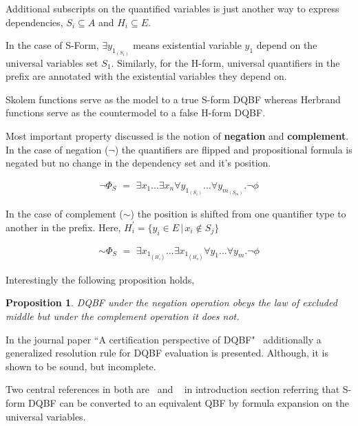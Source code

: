 \documentclass{article}
\newtheorem{prop}{Proposition}
\begin{document}
Additional subscripts on the quantified variables is just another way to express dependencies, $S_{i} \subseteq A$ and $H_{i} \subseteq E$.

In the case of S-Form, $\exists y_{1_{(S_{1})}}$ means  existential variable $y_{1}$ depend on the universal variables set $S_{1}$. 
%
Similarly, for the H-form, universal quantifiers in the prefix are annotated with the existential variables they depend on. 
     
Skolem functions serve as the model to a true S-form DQBF whereas Herbrand functions serve as the countermodel to a false H-form DQBF.

Most important property discussed is the notion of \textbf{negation} and \textbf{complement}.
%
In the case of negation ($\neg$) the quantifiers are flipped and propositional formula is negated but no change in the dependency set and it's position.
 
\begin{align}
\neg \Phi_{S} \,\, =   \,\, \exists x_{1}... \exists x_{n} \forall y_{1_{(S_{1})}}...\forall y_{m_{(S_{m})}} . \neg \phi \label{eq3}
\end{align}
 
In the case of complement ($\sim$) the position is shifted from one quantifier type to another in the prefix. Here, $H^{\prime}_{i} = \{ y_{i} \in E \, | \, x_{i} \notin S_{j} \}$
 
\begin{align}
 \sim \Phi_{S} \,\, =   \,\, \exists x_{1_{(H^{\prime}_1)}}... \exists x_{1_{(H^{\prime}_n)}} \forall y_{1}...\forall y_{m} . \neg \phi \label{eq4}
\end{align}
 
Interestingly the following proposition holds, 
\begin{prop}
	DQBF under the negation operation obeys the law of excluded middle but under the complement operation it does not.
\end{prop} 

In the journal paper ``A certification perspective of DQBF"~\cite{balabanov2014henkin} additionally a generalized resolution rule for DQBF evaluation is presented. Although,  it is shown to be sound, but incomplete.
	
Two central references in both are~\cite{bubeck2006dependency} and ~\cite{bubeck2010model} in introduction section referring that S-form DQBF can be converted to an equivalent QBF by formula expansion on the universal variables.
	
\end{document}
